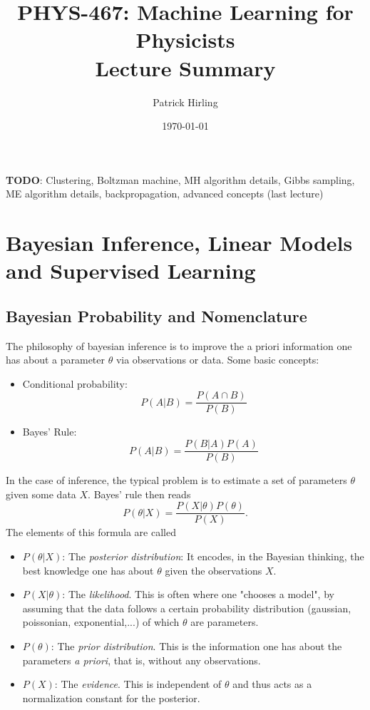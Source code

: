 \documentclass{article}
\title{PHYS-467: Machine Learning for Physicists\\\Large Lecture Summary}
\author{Patrick Hirling}
\date{\today}
\begin{document}
\maketitle
\tableofcontents

\noindent\textbf{TODO}: Clustering, Boltzman machine, MH algorithm details, Gibbs sampling, ME algorithm details, backpropagation, advanced concepts (last lecture)
\section{Bayesian Inference, Linear Models and Supervised Learning}
\subsection{Bayesian Probability and Nomenclature}
The philosophy of bayesian inference is to improve the a priori information one has about a parameter $\theta$ via observations or data.
Some basic concepts:
\begin{itemize}
    \item Conditional probability:
        \begin{equation}
            P(A|B) = \frac{P(A \cap B)}{P(B)}
        \end{equation}
    \item Bayes' Rule:
        \begin{equation}
            P(A|B) = \frac{P(B|A) P(A)}{P(B)}
        \end{equation}
\end{itemize}
In the case of inference, the typical problem is to estimate a set of parameters $\theta$ given some data $X$. Bayes' rule then reads
\begin{equation}
    P(\theta|X) = \frac{P(X|\theta) P(\theta)}{P(X)}.
\end{equation}
The elements of this formula are called
\begin{itemize}
    \item $P(\theta|X)$: The \emph{posterior distribution}: It encodes, in the Bayesian thinking, the best knowledge one has about $\theta$ given the observations $X$.
    \item $P(X|\theta)$: The \emph{likelihood}. This is often where one "chooses a model", by assuming that the data follows a certain probability distribution (gaussian, poissonian, exponential,...) of which $\theta$ are parameters.
    \item $P(\theta)$: The \emph{prior distribution}. This is the information one has about the parameters \emph{a priori}, that is, without any observations.
    \item $P(X)$: The \emph{evidence}. This is independent of $\theta$ and thus acts as a normalization constant for the posterior. 
\end{itemize}
\end{document}
